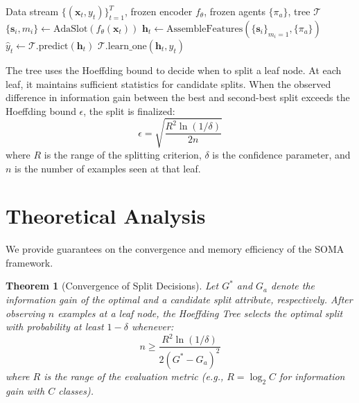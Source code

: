 \documentclass{article}
\newtheorem{theorem}{Theorem}
\newcommand{\calT}{\mathcal{T}}
\newcommand{\eg}{\textit{e.g.}}
\begin{document}
\begin{algorithm}[H]
\caption{SOMA Online Learning (Phase 3)}
\label{alg:online}
\begin{algorithmic}[1]
\REQUIRE Data stream $\{(\mathbf{x}_t, y_t)\}_{t=1}^{T}$, frozen encoder $f_\theta$, frozen agents $\{\pi_a\}$, tree $\calT$
    \STATE $\{\mathbf{s}_i, m_i\} \leftarrow \text{AdaSlot}(f_\theta(\mathbf{x}_t))$  
    \STATE $\mathbf{h}_t \leftarrow \text{AssembleFeatures}(\{\mathbf{s}_i\}_{m_i=1}, \{\pi_a\})$
    \STATE $\hat{y}_t \leftarrow \calT.\text{predict}(\mathbf{h}_t)$  
    \STATE $\calT.\text{learn\_one}(\mathbf{h}_t, y_t)$  
\ENDFOR
\end{algorithmic}
\end{algorithm}

The tree uses the Hoeffding bound to decide when to split a leaf node. At each leaf, it maintains sufficient statistics for candidate splits. When the observed difference in information gain between the best and second-best split exceeds the Hoeffding bound $\epsilon$, the split is finalized:
\begin{equation}
    \epsilon = \sqrt{\frac{R^2 \ln(1/\delta)}{2n}}
    \label{eq:hoeffding}
\end{equation}
where $R$ is the range of the splitting criterion, $\delta$ is the confidence parameter, and $n$ is the number of examples seen at that leaf.


\section{Theoretical Analysis}
\label{sec:theory}

We provide guarantees on the convergence and memory efficiency of the SOMA framework.

\begin{theorem}[Convergence of Split Decisions]
\label{thm:hoeffding_convergence}
Let $G^*$ and $G_a$ denote the information gain of the optimal and a candidate split attribute, respectively. After observing $n$ examples at a leaf node, the Hoeffding Tree selects the optimal split with probability at least $1 - \delta$ whenever:
\begin{equation}
    n \geq \frac{R^2 \ln(1/\delta)}{2(G^* - G_a)^2}
\end{equation}
where $R$ is the range of the evaluation metric (\eg, $R=\log_2 C$ for information gain with $C$ classes).
\end{theorem}
\end{document}
